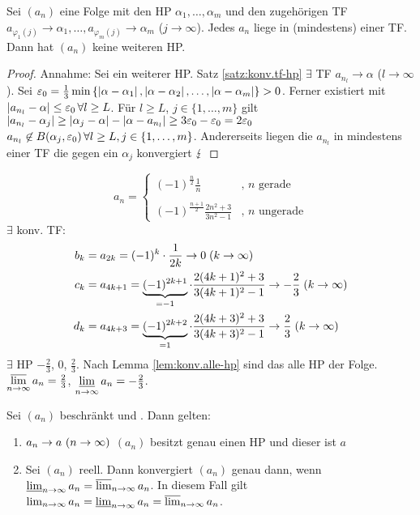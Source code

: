 \documentclass[12pt]{scrreprt}
\begin{document}
\begin{lem}
\label{lem:konv.alle-hp}
Sei $(a_n)$ eine Folge mit den HP $\alpha_1,\dotsc,\alpha_m$ und den zugehörigen TF $a_{\varphi_1(j)}\to\alpha_1,\dotsc,a_{\varphi_m(j)}\to\alpha_m$ ($j\to\infty$). Jedes $a_n$ liege in (mindestens) einer TF. Dann hat $(a_n)$ keine weiteren HP.
\end{lem}
\begin{proof}
Annahme: Sei \kmplx{\alpha} ein weiterer HP. Satz \ref{satz:konv.tf-hp} \folgt $\exists$ TF $a_{n_l}\to\alpha$ ($l\to\infty$). Sei $\varepsilon_0 = \frac13 \min{\{\left\lvert\alpha-\alpha_1\right\lvert, \left\lvert\alpha-\alpha_2\right\lvert, \dotsc, \left\lvert\alpha-\alpha_m\right\lvert\}} > 0$. Ferner existiert  mit $\left\lvert a_{n_l}-\alpha\right\lvert\le\varepsilon_0\,\forall l\ge L$. \folgt Für $l\ge L$, $j\in\{1,\dotsc,m\}$ gilt $\left\lvert a_{n_l}-\alpha_j\right\lvert \ge \left\lvert\alpha_j-\alpha\right\lvert-\left\lvert\alpha-a_{n_l}\right\lvert \ge 3\varepsilon_0-\varepsilon_0 = 2\varepsilon_0$ \folgt $a_{n_l} \not\in B(\alpha_j, \varepsilon_0)\,\forall l\ge L, j\in\{1,\dotsc,m\}$. Andererseits liegen die $a_{n_l}$ in mindestens einer TF die gegen ein $\alpha_j$ konvergiert \folgt $\lightning$
\end{proof}

\begin{bsp}
\label{bsp:konv.bw}
\[a_n = \begin{cases}
\left(-1\right)^{\frac{n}{2}}\frac1n &\text{, } n \text{ gerade} \\\;\\
\left(-1\right)^{\frac{n+1}{2}}\frac{2n^2+3}{3n^2-1} &\text{, } n \text{ ungerade} \end{cases} \]
$\exists$ konv. TF:
\begin{align*}
b_k &= a_{2k} = (-1)^k \cdot \frac{1}{2k} \to 0 \; (k\rightarrow\infty) \\
c_k &= a_{4k+1} = \underbrace{(-1)^{2k+1}}_{=-1} \cdot \frac{2(4k+1)^2+3}{3(4k+1)^2-1} \to -\frac23 \; (k\rightarrow\infty) \\
d_k &= a_{4k+3} = \underbrace{(-1)^{2k+2}}_{=1} \cdot \frac{2(4k+3)^2+3}{3(4k+3)^2-1} \to \frac23 \; (k\rightarrow\infty)
\end{align*}
\folgt $\exists$ HP $-\frac23$, $0$, $\frac23$. Nach Lemma \ref{lem:konv.alle-hp} sind das alle HP der Folge.\\
\folgtnach{\ref{thm:konv.bw}} $\varlimsup\limits_{n\rightarrow\infty}{a_n}=\frac23$, $\varliminf\limits_{n\rightarrow\infty}{a_n}=-\frac23$.
\end{bsp}

\begin{kor}
\label{kor:konv.namevergessen}
Sei $(a_n)$ beschränkt und . Dann gelten:
\begin{enumerate}
\item $a_n\to a\ (n\rightarrow\infty)$ \gdw $(a_n)$ besitzt genau einen HP und dieser ist $a$
\item Sei $(a_n)$ reell. Dann konvergiert $(a_n)$ genau dann, wenn $\varliminf_{n\rightarrow\infty}{a_n}=\varlimsup_{n\rightarrow\infty}{a_n}$. In diesem Fall gilt $\lim_{n\rightarrow\infty}{a_n}=\varliminf_{n\rightarrow\infty}{a_n}=\varlimsup_{n\rightarrow\infty}{a_n}$.
\end{enumerate}
\end{kor}
\end{document}
